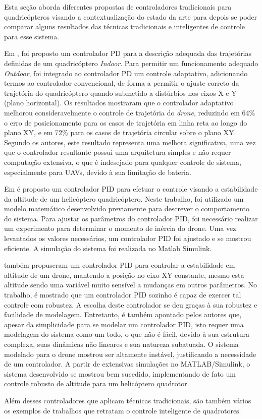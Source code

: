 Esta seção aborda diferentes propostas de controladores tradicionais para quadricópteros visando a contextualização do estado da arte para depois se poder comparar alguns resultados das técnicas tradicionais e inteligentes de controle para esse sistema.

Em \cite{Razinkova2014}, foi proposto um controlador PD para a descrição adequada das trajetórias definidas de um quadricóptero \textit{Indoor}. Para permitir um funcionamento adequado \textit{Outdoor}, foi integrado ao controlador PD um controle adaptativo, adicionando termos ao controlador convencional, de forma a permitir o ajuste correto da trajetória do quadricóptero quando submetido a distúrbios nos eixos X e Y (plano horizontal). Os resultados mostraram que o controlador adaptativo melhorou consideravelmente o controle de trajetória do \textit{drone}, reduzindo em 64\% o erro de posicionamento para os casos de trajetória em linha reta ao longo do plano XY, e em 72\% para os casos de trajetória circular sobre o plano XY. Segundo os autores, este resultado representa uma melhora significativa, uma vez que o controlador resultante possui uma arquitetura simples e não requer computação extensiva, o que é indesejado para qualquer controle de sistema, especialmente para UAVs, devido à sua limitação de bateria.

Em \cite{Mustapa2014} é proposto um controlador PID para efetuar o controle visando a estabilidade da altitude de um helicóptero quadricóptero. Neste trabalho, foi utilizado um modelo matemático desenvolvido previamente para descrever o comportamento do sistema. Para ajustar os parâmetros do controlador PID, foi necessário realizar um experimento para determinar o momento de inércia do drone. Uma vez levantados os valores necessários, um controlador PID foi ajustado e se mostrou eficiente. A simulação do sistema foi realizada no Matlab Simulink\textsuperscript{\textregistered}.

 também propuseram um controlador PID para controlar a estabilidade em altitude de um drone, mantendo a posição no eixo XY constante, mesmo esta altitude sendo uma variável muito sensível a mudanças em outros parâmetros. No trabalho, é mostrado que um controlador PID sozinho é capaz de exercer tal controle com robustez. A escolha deste controlador se deu graças à sua robustez e facilidade de modelagem. Entretanto, é também apontado pelos autores que, apesar da simplicidade para se modelar um controlador PID, isto requer uma modelagem do sistema como um todo, o que não é fácil, devido à sua estrutura complexa, suas dinâmicas não lineares e sua natureza subatuada. O sistema modelado para o drone mostrou ser altamente instável, justificando a necessidade de um controlador. A partir de extensivas simulações no MATLAB/Simulink, o sistema desenvolvido se mostrou bem sucedido, implementando de fato um controle robusto de altitude para um helicóptero quadrotor.

Além desses controladores que aplicam técnicas tradicionais, são também vários os exemplos de trabalhos que retratam o controle inteligente de quadrotores.